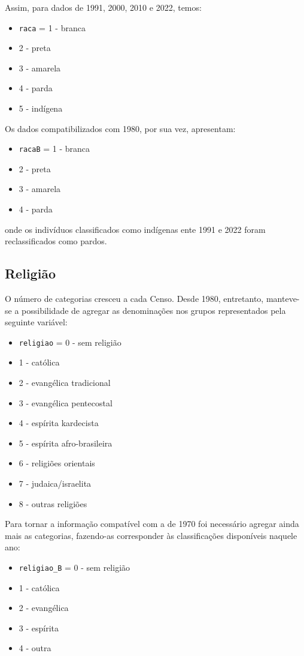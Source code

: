 \documentclass[12pt,a4paper]{article}
\newcommand{\vr}[1]{\texttt{#1}}
\begin{document}
Assim, para dados de 1991, 2000, 2010 e 2022, temos:
\begin{itemize}
  \item \vr{raca} = 1 - branca
  \item 2 - preta
  \item 3 - amarela
  \item 4 - parda
  \item 5 - indígena
\end{itemize}

Os dados compatibilizados com 1980, por sua vez, apresentam:
\begin{itemize}
  \item \vr{racaB} = 1 - branca
  \item 2 - preta
  \item 3 - amarela
  \item 4 - parda
\end{itemize}
onde os indivíduos classificados como indígenas ente 1991 e 2022 foram reclassificados como pardos.

\subsection{Religião}\label{sec:d5}
O número de categorias cresceu a cada Censo. Desde 1980, entretanto, manteve-se a possibilidade de agregar as denominações nos grupos representados pela seguinte variável:
\begin{itemize}
  \item \vr{religiao} = 0 - sem religião
  \item 1 - católica
  \item 2 - evangélica tradicional
  \item 3 - evangélica pentecostal
  \item 4 - espírita kardecista
  \item 5 - espírita afro-brasileira
  \item 6 - religiões orientais
  \item 7 - judaica/israelita
  \item 8 - outras religiões
\end{itemize}

Para tornar a informação compatível com a de 1970 foi necessário agregar ainda mais as categorias, fazendo-as corresponder às classificações disponíveis naquele ano:
\begin{itemize}
  \item \vr{religiao\_B} = 0 - sem religião
  \item 1 - católica
  \item 2 - evangélica
  \item 3 - espírita
  \item 4 - outra
\end{itemize}
\end{document}
